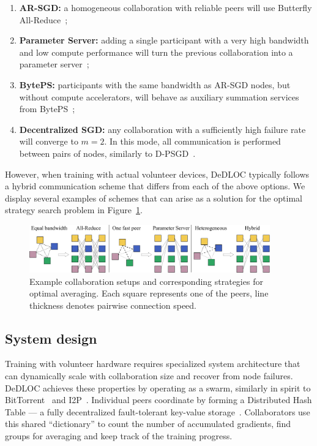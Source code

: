 \begin{enumerate}[leftmargin=*]
    \item \textbf{AR-SGD:} a homogeneous collaboration with reliable peers will use Butterfly All-Reduce~\cite{butterfly_arsgd};
    \item \textbf{Parameter Server:} adding a single participant with a very high bandwidth and low compute performance will turn the previous collaboration into a parameter server~\cite{ps};
    \item \textbf{BytePS:} participants with the same bandwidth as AR-SGD nodes, but without compute accelerators, will behave as auxiliary summation services from BytePS~\cite{byteps};
    \item \textbf{Decentralized SGD:} any collaboration with a sufficiently high failure rate will converge to $m{=}2$. In this mode, all communication is performed between pairs of nodes, similarly to D-PSGD~\cite{dp_sgd}.
\end{enumerate}

However, when training with actual volunteer devices, DeDLOC typically follows a hybrid communication scheme that differs from each of the above options. We display several examples of schemes that can arise as a solution for the optimal strategy search problem in Figure~\ref{fig:examples}.

\begin{figure}[t]
    \centering
    \includegraphics[height=78px]{resources/adaptive.pdf}
    \caption{Example collaboration setups and corresponding strategies for optimal averaging. Each square represents one of the peers, line thickness denotes pairwise connection speed.}
    \label{fig:examples}
    \vspace{-12pt}
\end{figure}

\vspace{-2pt}
\subsection{System design}\label{sect:method_system_design}

Training with volunteer hardware requires specialized system architecture that can dynamically scale with collaboration size and recover from node failures. DeDLOC achieves these properties by operating as a swarm, similarly in spirit to BitTorrent~\cite{torrent} and I2P~\cite{i2p}. Individual peers coordinate by forming a Distributed Hash Table --- a fully decentralized fault-tolerant key-value storage~\cite{kademlia,kaashoek2003koorde}. Collaborators use this shared ``dictionary'' to count the number of accumulated gradients, find groups for averaging and keep track of the training progress.

